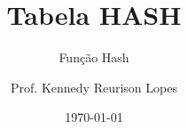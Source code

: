 \documentclass[12pt]{beamer}
\title{Tabela HASH}
\subtitle{Função Hash}
\author{Prof. Kennedy Reurison Lopes}
\date{\today}
\begin{document}
\frame{\titlepage}
\end{document}
